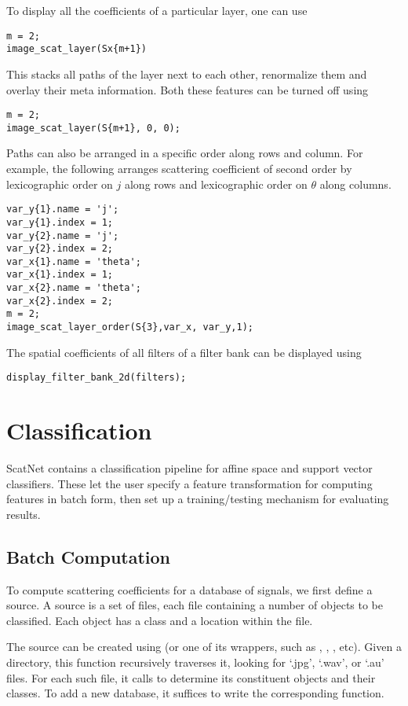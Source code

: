 \documentclass{article}
\begin{document}
To display all the coefficients of a particular layer, one can use 
\begin{lstlisting}
m = 2;
image_scat_layer(Sx{m+1})
\end{lstlisting}
This stacks all paths of the layer next to each other, renormalize them and overlay their meta information. Both these features can be turned off using
\begin{lstlisting}
m = 2;
image_scat_layer(S{m+1}, 0, 0);
\end{lstlisting}
Paths can also be arranged in a specific order along rows and column.
For example, the following arranges scattering coefficient of second order
by lexicographic order on $j$ along rows and lexicographic order on $\theta$ along columns.
\begin{lstlisting}
var_y{1}.name = 'j';
var_y{1}.index = 1;
var_y{2}.name = 'j';
var_y{2}.index = 2;
var_x{1}.name = 'theta';
var_x{1}.index = 1;
var_x{2}.name = 'theta';
var_x{2}.index = 2;
m = 2;
image_scat_layer_order(S{3},var_x, var_y,1);
\end{lstlisting}
The spatial coefficients of all filters of a filter bank can be displayed using
\begin{lstlisting}
display_filter_bank_2d(filters);
\end{lstlisting}

\section{Classification \label{sec:classification}}

ScatNet contains a classification pipeline for affine space and support vector classifiers. These let the user specify a feature transformation for computing features in batch form, then set up a training/testing mechanism for evaluating results.

\subsection{Batch Computation \label{sec:batch-computation}}

To compute scattering coefficients for a database of signals, we first define a source. A source is a set of files, each file containing a number of objects to be classified. Each object has a class and a location within the file.

The source can be created using  (or one of its wrappers, such as , , , etc). Given a directory, this function recursively traverses it, looking for `.jpg', `.wav', or `.au' files. For each such file, it calls  to determine its constituent objects and their classes. To add a new database, it suffices to write the corresponding  function.
\end{document}
